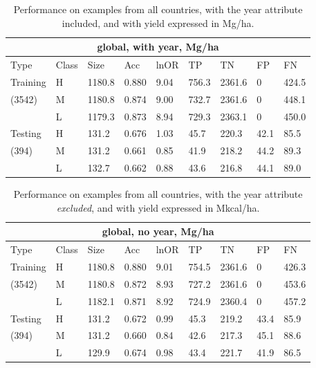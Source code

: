 \documentclass[11pt]{article}
\begin{document}
\begin{table}[h!]
\centering
\begin{tabular}{lllllllll}
\toprule
\multicolumn{9}{c}{\textbf{global, with year, Mg/ha}} \\
\midrule
Type & Class & Size & Acc & lnOR & TP & TN & FP & FN \\
\midrule
Training & H & 1180.8 & 0.880 & 9.04 & 756.3 & 2361.6 & 0 & 424.5  \\
(3542) & M & 1180.8 & 0.874 & 9.00 & 732.7 & 2361.6 & 0 & 448.1  \\
& L & 1179.3 & 0.873 & 8.94 & 729.3 & 2363.1 & 0 & 450.0  \\
Testing & H & 131.2 & 0.676 & 1.03 & 45.7 & 220.3 & 42.1 & 85.5  \\
(394) & M & 131.2 & 0.661 & 0.85 & 41.9 & 218.2 & 44.2 & 89.3  \\
& L & 132.7 & 0.662 & 0.88 & 43.6 & 216.8 & 44.1 & 89.0  \\
\bottomrule
\end{tabular}
\caption{Performance on examples from all countries, with the year attribute included, and with yield expressed in Mg/ha.}
\label{t.wy.wt_results}
\end{table}

\begin{table}[h!]
\centering
\begin{tabular}{lllllllll}
\toprule
\multicolumn{9}{c}{\textbf{global, no year, Mg/ha}} \\
\midrule
Type & Class & Size & Acc & lnOR & TP & TN & FP & FN \\
\midrule
Training & H & 1180.8 & 0.880 & 9.01 & 754.5 & 2361.6 & 0 & 426.3  \\
(3542) & M & 1180.8 & 0.872 & 8.93 & 727.2 & 2361.6 & 0 & 453.6  \\
& L & 1182.1 & 0.871 & 8.92 & 724.9 & 2360.4 & 0 & 457.2  \\
Testing & H & 131.2 & 0.672 & 0.99 & 45.3 & 219.2 & 43.4 & 85.9 \\
(394) & M & 131.2 & 0.660 & 0.84 & 42.6 & 217.3 & 45.1 & 88.6 \\
& L & 129.9 & 0.674 & 0.98 & 43.4 & 221.7 & 41.9 & 86.5 \\
\bottomrule
\end{tabular}
\caption{Performance on examples from all countries, with the year attribute \emph{excluded}, and with yield expressed in Mkcal/ha.}
\label{t.ny.wt_results}
\end{table}

\clearpage


\end{document}
